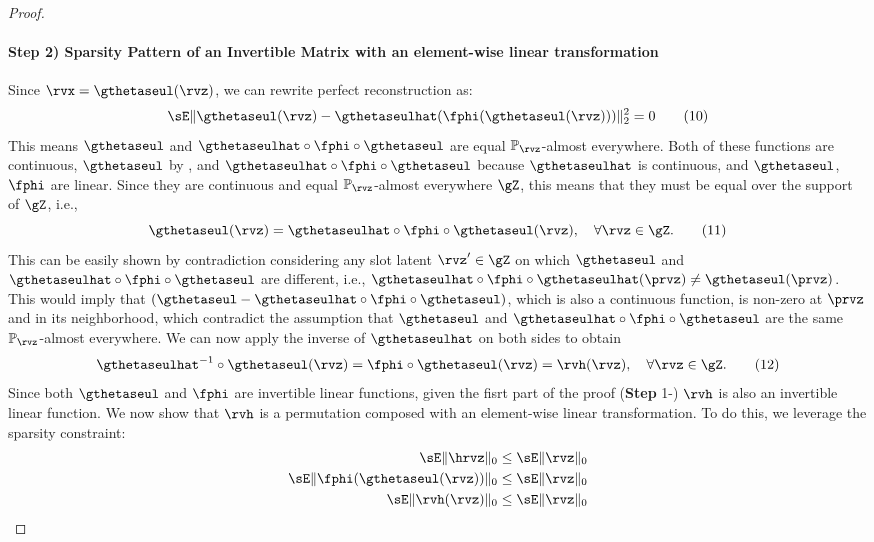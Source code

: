\documentclass{article} %
\theoremstyle{plain}
\theoremstyle{definition}
\theoremstyle{remark}
\numberwithin{equation}{section}
\begin{document}
\begin{proof}
\paragraph{{{\bf Step }\textcolor{crefcolor}{2)}} Sparsity Pattern of an Invertible Matrix with an element-wise linear transformation} Since \(\rvx = \gthetaseul(\rvz)\), we can rewrite perfect reconstruction as:
\[
\sE \|\gthetaseul(\rvz) - \gthetaseulhat(\fphi(\gthetaseul(\rvz)))\|^2_2 = 0 \tag{10}
\]
This means \( \gthetaseul \) and \( \gthetaseulhat \circ \fphi \circ \gthetaseul \) are equal $\mathbb{P}_{\rvz}$-almost everywhere. Both of these functions are continuous, \( \gthetaseul \) by , and \( \gthetaseulhat \circ \fphi \circ \gthetaseul \) because \( \gthetaseulhat \) is continuous, and \( \gthetaseul \), \( \fphi \) are linear. Since they are continuous and equal $\mathbb{P}_{\rvz}$-almost everywhere $\gZ$, this means that they must be equal over the support of \( \gZ \), i.e.,
\[
\gthetaseul(\rvz) = \gthetaseulhat \circ \fphi \circ \gthetaseul(\rvz), \quad \forall \rvz \in \gZ. \tag{11}
\]
This can be easily shown by contradiction considering any slot latent \( \rvz' \in \gZ \) on which \( \gthetaseul \) and \( \gthetaseulhat \circ \fphi \circ \gthetaseul \) are different, i.e., \( \gthetaseulhat \circ \fphi \circ \gthetaseulhat(\prvz) \neq \gthetaseul(\prvz) \). This would imply that \( (\gthetaseul - \gthetaseulhat \circ \fphi \circ \gthetaseul) \), which is also a continuous function, is non-zero at \( \prvz \) and in its neighborhood, which contradict the assumption that \( \gthetaseul \) and \( \gthetaseulhat \circ \fphi \circ \gthetaseul \) are the same $\mathbb{P}_{\rvz}$-almost everywhere. We can now apply the inverse of \( \gthetaseulhat \) on both sides to obtain
\[
\gthetaseulhat^{-1} \circ \gthetaseul(\rvz) = \fphi \circ \gthetaseul(\rvz)=\rvh(\rvz), \quad \forall \rvz \in \gZ. \tag{12}
\]
Since both \( \gthetaseul \) and \( \fphi \) are invertible linear functions, given the fisrt part of the proof ({\bf Step }\textcolor{crefcolor}{1}-) \( \rvh \) is also an invertible linear function. We now show that \( \rvh \) is a permutation composed with an element-wise linear transformation. To do this, we leverage the sparsity constraint:
\begin{align}
\sE \|\hrvz \|_0 \leq \sE \|\rvz\|_0 \\
\sE \|\fphi(\gthetaseul(\rvz))\|_0 \leq \sE \|\rvz\|_0 \\
\sE \|\rvh(\rvz)\|_0 \leq \sE \|\rvz\|_0 \\

\end{align}
\end{proof}
\end{document}
